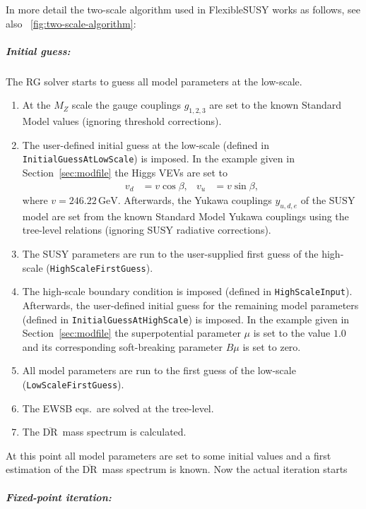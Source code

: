 \documentclass[final,3p,11pt,pdflatex]{elsarticle}
\makeatletter
\newcommand{\fs}{FlexibleSUSY\@\xspace}
\newcommand{\code}[1]{\lstinline|#1|}  %
\newcommand{\textoverline}[1]{$\overline{\mbox{#1}}$}
\newcommand{\DRbar}{\textoverline{DR}\xspace}
\newcommand{\unit}[1]{\,\text{#1}}      %
\newcommand{\figref}[1]{\figurename~\ref{#1}}
\newcommand{\secref}[1]{Section~\ref{#1}}
\makeatother
\begin{document}
In more detail the two-scale algorithm used in \fs works as
follows, see also \figref{fig:two-scale-algorithm}:
%
\subparagraph{Initial guess:} The RG solver starts to guess all model
parameters at the low-scale.
%
\begin{enumerate}
\item At the $M_Z$ scale the gauge couplings $g_{1,2,3}$ are set to
  the known Standard Model values (ignoring threshold corrections).
\item The user-defined initial guess at the low-scale (defined in
  \code{InitialGuessAtLowScale}) is imposed.  In the example given in
  \secref{sec:modfile} the Higgs VEVs are set to
  \begin{align}
    v_d &= v \cos\beta, & v_u &= v \sin\beta ,
  \end{align}
  where $v=246.22\unit{GeV}$.  Afterwards, the Yukawa couplings
  $y_{u,d,e}$ of the SUSY model are set from the known Standard Model
  Yukawa couplings using the tree-level relations (ignoring SUSY
  radiative corrections).
\item The SUSY parameters are run to the user-supplied first guess of
  the high-scale (\code{HighScaleFirstGuess}).
\item The high-scale boundary condition is imposed (defined in
  \code{HighScaleInput}).  Afterwards, the user-defined initial guess
  for the remaining model parameters (defined in
  \code{InitialGuessAtHighScale}) is imposed.  In the example given in
  \secref{sec:modfile} the superpotential parameter $\mu$ is set to
  the value $1.0$ and its corresponding soft-breaking parameter $B\mu$
  is set to zero.
\item All model parameters are run to the first guess of the low-scale
  (\code{LowScaleFirstGuess}).
\item The EWSB eqs.\ are solved at the tree-level.
\item The \DRbar\ mass spectrum is calculated.
\end{enumerate}
%
At this point all model parameters are set to some initial values and
a first estimation of the \DRbar\ mass spectrum is known.  Now the
actual iteration starts
%
\subparagraph{Fixed-point iteration:}
%
\end{document}
